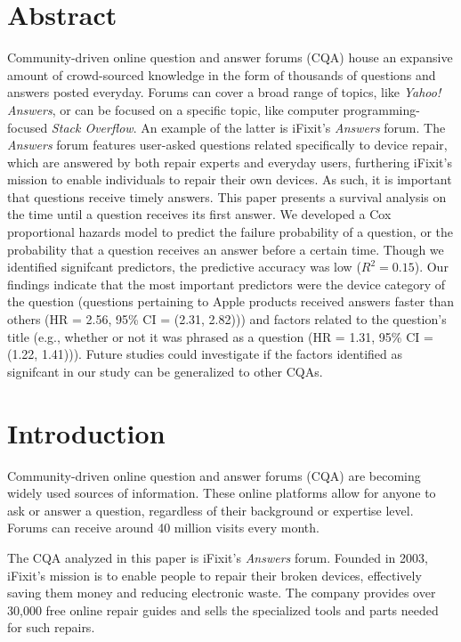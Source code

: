 \documentclass{article}
\begin{document}





\section*{Abstract}

Community-driven online question and answer forums (CQA) house an expansive amount of crowd-sourced knowledge in the form of thousands of questions and answers posted everyday. Forums can cover a broad range of topics, like \textit{Yahoo! Answers}, or can be focused on a specific topic, like computer programming-focused \textit{Stack Overflow}. An example of the latter is iFixit's \textit{Answers} forum. The \textit{Answers} forum features user-asked questions related specifically to device repair, which are answered by both repair experts and everyday users, furthering iFixit's mission to enable individuals to repair their own devices. As such, it is important that questions receive timely answers. This paper presents a survival analysis on the time until a question receives its first answer. We developed a Cox proportional hazards model to predict the failure probability of a question, or the probability that a question receives an answer before a certain time. Though we identified signifcant predictors, the predictive accuracy was low ($R^2 = 0.15$). Our findings indicate that the most important predictors were the device category of the question (questions pertaining to Apple products received answers faster than others (HR = 2.56, 95\% CI = (2.31, 2.82))) and factors related to the question's title (e.g., whether or not it was phrased as a question (HR = 1.31, 95\% CI = (1.22, 1.41))). Future studies could investigate if the factors identified as signifcant in our study can be generalized to other CQAs. 


\section*{Introduction}

Community-driven online question and answer forums (CQA) are becoming widely used sources of information. These online platforms allow for anyone to ask or answer a question, regardless of their background or expertise level. Forums can receive around 40 million visits every month.
    
The CQA analyzed in this paper is iFixit's \textit{Answers} forum. Founded in 2003, iFixit's mission is to enable people to repair their broken devices, effectively saving them money and reducing electronic waste. The company provides over 30,000 free online repair guides and sells the specialized tools and parts needed for such repairs.
    
\end{document}
